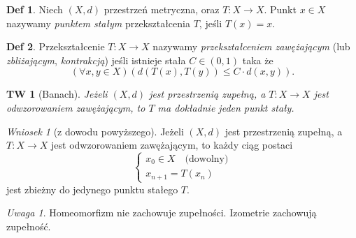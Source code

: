 \documentclass[a4paper, 12pt]{mwart}
\theoremstyle{definition}
\newtheorem{definicja}{Def}[section]
\theoremstyle{plain}
\newtheorem{twierdzenie}{TW}[section]
\theoremstyle{remark}
\newtheorem{wniosek}{Wniosek}[section]
\newtheorem*{uwaga}{Uwaga}
\begin{document}
\begin{definicja}
	Niech $(X, d)$ \ppauza przestrzeń metryczna, oraz $T \colon X \to X$.
	Punkt $x \in X$ nazywamy \emph{punktem stałym} przekształcenia $T$, jeśli $T(x) = x$.
\end{definicja}
\begin{definicja}
	Przekształcenie $T \colon X \to X$ nazywamy \emph{przekształceniem zawężającym} (lub \emph{zbliżającym}, \emph{kontrakcją}) jeśli istnieje stała $C \in (0, 1)$ taka że
	\begin{equation}
		\left(\forall x, y \in X\right)\left(d(T(x), T(y)) \leq C \cdot d(x, y)\right).
	\end{equation}
\end{definicja}
\begin{twierdzenie}[Banach]
	Jeżeli  $(X, d)$ jest przestrzenią zupełną, a $T \colon X \to X$ jest odwzorowaniem zawężającym, to $T$ ma dokładnie jeden punkt stały.
\end{twierdzenie}
\begin{wniosek}[z dowodu powyższego]
	Jeżeli  $(X, d)$ jest przestrzenią zupełną, a $T \colon X \to X$ jest odwzorowaniem zawężającym, to każdy ciąg postaci
	\begin{equation}
		\begin{cases}
			x_0 \in X \quad \text{(dowolny)}\\
			x_{n+1} = T(x_n)
		\end{cases}
	\end{equation}
	jest zbieżny do jedynego punktu stałego $T$.
\end{wniosek}
\begin{uwaga}
	Homeomorfizm nie zachowuje zupełności. Izometrie zachowują zupełność.
\end{uwaga}
\end{document}
